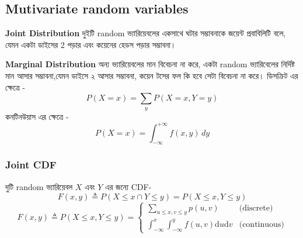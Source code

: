 \documentclass[graybox, envcountchap, twocolumn]{styles/svmult}
\begin{document}


\subsection{Mutivariate random variables}
\textbf{Joint Distribution}
{\bengalifont দুইটি random ভ্যারিয়েবলের একসাথে ঘটার সম্ভাবনাকে জয়েন্ট প্রবাবিলিটি বলে, যেমন একটা ডাইসের 2 পড়ার এবং কয়েনের হেডস পড়ার সম্ভাবনা। }

\textbf{Marginal Distribution}
{\bengalifont অন্য ভ্যারিয়েবলের মান বিবেচনা না করে, একটা random ভ্যারিবেলের নির্দিষ্ট মান আসার সম্ভাবনা,যেমন ডাইসে ২ আসার সম্ভাবনা, কয়েন টসের ফল কি হবে সেটা বিবেচনা না করে।
ডিসক্রিট এর ক্ষেত্রে - }
\begin{equation}
    P(X = x) = \sum_y P(X = x, Y = y)
\end{equation} 
{\bengalifont কনটিনউয়াস এর ক্ষেত্রে }- 
\begin{equation}
    P(X = x) = \int_{-\infty}^{+\infty} f(x, y) \, dy
\end{equation}

\subsubsection{Joint CDF}
{\bengalifont দুটি random ভ্যারিয়েবল $X$ এবং $Y$ এর জন্যে } CDF- 
\[
F(x,y) \triangleq P(X \leq x \cap Y \leq y)=P(X \leq x , Y \leq y)
\]
\begin{equation}
F(x,y) \triangleq P(X \leq x, Y \leq y) = \begin{cases}
\sum_{u \leq x, v \leq y} p(u,v) & \text{(discrete)} \\
\int_{-\infty}^{x} \int_{-\infty}^{y} f(u,v)\mathrm{d}u \mathrm{d}v & \text{(continuous)}
\end{cases}
\end{equation}
\end{document}
